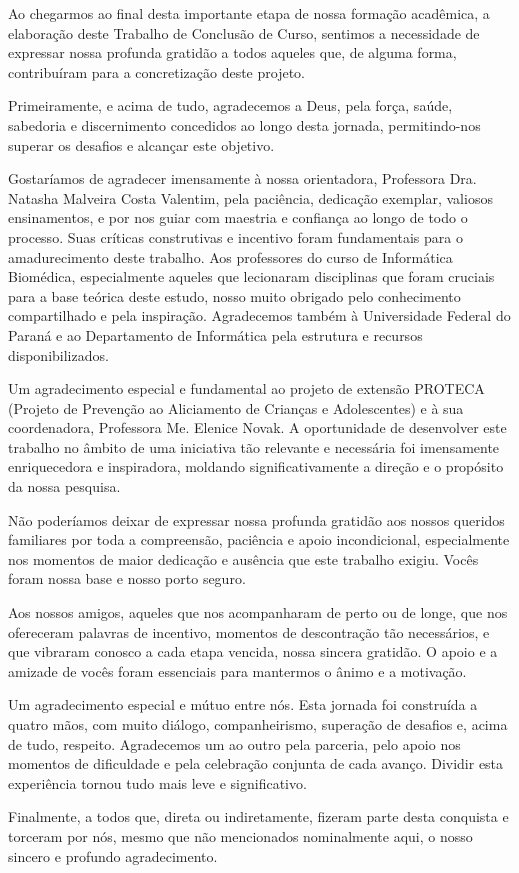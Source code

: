 \begin{agradece}	%

Ao chegarmos ao final desta importante etapa de nossa formação acadêmica, a elaboração deste Trabalho de Conclusão de Curso, sentimos a necessidade de expressar nossa profunda gratidão a todos aqueles que, de alguma forma, contribuíram para a concretização deste projeto.

Primeiramente, e acima de tudo, agradecemos a Deus, pela força, saúde, sabedoria e discernimento concedidos ao longo desta jornada, permitindo-nos superar os desafios e alcançar este objetivo.

Gostaríamos de agradecer imensamente à nossa orientadora, Professora Dra. Natasha Malveira Costa Valentim, pela paciência, dedicação exemplar, valiosos ensinamentos, e por nos guiar com maestria e confiança ao longo de todo o processo. Suas críticas construtivas e incentivo foram fundamentais para o amadurecimento deste trabalho.
Aos professores do curso de Informática Biomédica, especialmente aqueles que lecionaram disciplinas que foram cruciais para a base teórica deste estudo, nosso muito obrigado pelo conhecimento compartilhado e pela inspiração. Agradecemos também à Universidade Federal do Paraná e ao Departamento de Informática pela estrutura e recursos disponibilizados.

Um agradecimento especial e fundamental ao projeto de extensão PROTECA (Projeto de Prevenção ao Aliciamento de Crianças e Adolescentes) e à sua coordenadora, Professora Me. Elenice Novak. A oportunidade de desenvolver este trabalho no âmbito de uma iniciativa tão relevante e necessária foi imensamente enriquecedora e inspiradora, moldando significativamente a direção e o propósito da nossa pesquisa.

Não poderíamos deixar de expressar nossa profunda gratidão aos nossos queridos familiares por toda a compreensão, paciência e apoio incondicional, especialmente nos momentos de maior dedicação e ausência que este trabalho exigiu. Vocês foram nossa base e nosso porto seguro.

Aos nossos amigos, aqueles que nos acompanharam de perto ou de longe, que nos ofereceram palavras de incentivo, momentos de descontração tão necessários, e que vibraram conosco a cada etapa vencida, nossa sincera gratidão. O apoio e a amizade de vocês foram essenciais para mantermos o ânimo e a motivação.

Um agradecimento especial e mútuo entre nós. Esta jornada foi construída a quatro mãos, com muito diálogo, companheirismo, superação de desafios e, acima de tudo, respeito. Agradecemos um ao outro pela parceria, pelo apoio nos momentos de dificuldade e pela celebração conjunta de cada avanço. Dividir esta experiência tornou tudo mais leve e significativo.

Finalmente, a todos que, direta ou indiretamente, fizeram parte desta conquista e torceram por nós, mesmo que não mencionados nominalmente aqui, o nosso sincero e profundo agradecimento.

\end{agradece}

